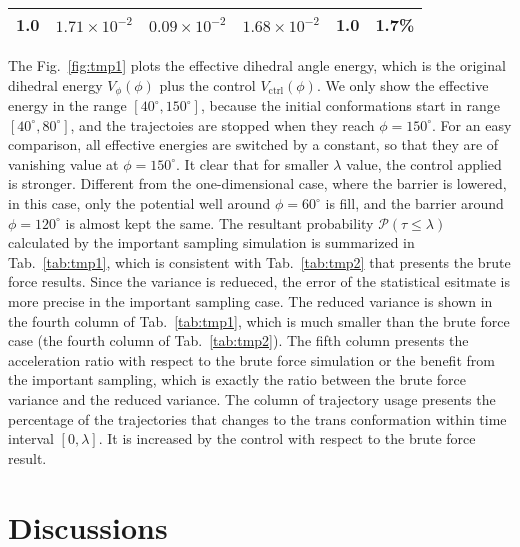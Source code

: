 \documentclass[final]{siamltex}
\begin{document}
\begin{table}[t]
\begin{tabular*}{0.9\textwidth}{@{\extracolsep{\fill}}lcccrr}
    1.0 & $1.71\times 10^{-2}$ & $0.09\times 10^{-2}$ & $1.68\times10^{-2}$ & 1.0 & 1.7\%\\
    \hline\hline
  \end{tabular*}
\end{table}

The Fig.~\ref{fig:tmp1} plots the effective dihedral angle energy,
which is the original dihedral energy $V_\phi(\phi)$ plus the control
$V_{\textrm{ctrl}}(\phi)$. We only show the effective energy in the
range $[40^\circ, 150^\circ]$, because the initial
conformations start in range $[40^\circ, 80^\circ]$, and the
trajectoies are stopped when they reach $\phi = 150^\circ$. For an easy
comparison, all effective energies are switched by a constant, so that
they are of vanishing value at $\phi = 150^\circ$. It clear that for
smaller $\lambda$ value, the control applied is stronger. Different
from the one-dimensional case, where the barrier is lowered, in this
case, only the potential well around $\phi = 60^\circ$ is fill, and
the barrier around $\phi = 120^\circ$ is almost kept the same.  The
resultant probability $\mathcal{P} (\tau \leq \lambda)$ calculated by the
important sampling simulation is summarized in Tab.~\ref{tab:tmp1},
which is consistent with Tab.~\ref{tab:tmp2} that presents the
brute force results. Since the variance is redueced, the error of the
statistical esitmate is more precise in the important sampling case. The
reduced variance is shown in the fourth column of Tab.~\ref{tab:tmp1},
which is much smaller than the brute force case (the fourth column of
Tab.~\ref{tab:tmp2}). The fifth column presents the acceleration ratio
with respect to the brute force simulation or the benefit from the
important sampling, which is exactly the ratio between the brute force
variance and the reduced variance. The column of trajectory usage
presents the percentage of the trajectories that changes to the trans
conformation within time interval $[0, \lambda]$. It is increased by
the control with respect to the brute force result.




\section{Discussions}
\label{sec-discuss}
\end{document}
